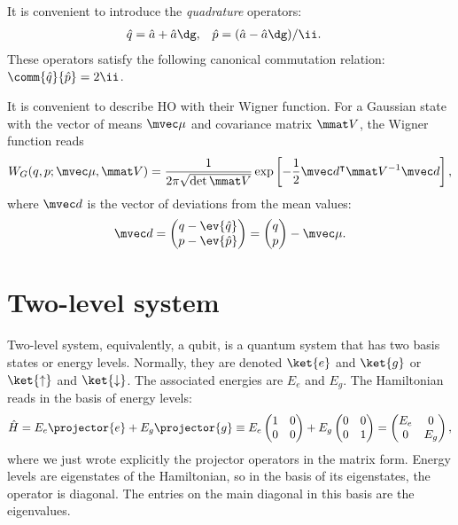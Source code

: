 \documentclass[fontsize=9pt,bookmarkpackage=false]{scrartcl}
\begin{document}
It is convenient to introduce the \emph{quadrature} operators:
\begin{align}
  \hat q & = \hat a + \hat a\dg, &
  \hat p & = ( \hat a - \hat a\dg ) / \ii.
\end{align}
These operators satisfy the following canonical commutation relation: $\comm{ \hat q }{ \hat p } = 2 \ii$.

It is convenient to describe HO with their Wigner function.
For a Gaussian state with the vector of means $\mvec \mu$ and covariance matrix $\mmat V$, the Wigner function reads
\begin{equation}
  W_G ( q , p ; \mvec \mu, \mmat V )
  =
  \frac{ 1 }{ 2 \pi \sqrt{ \det \mmat V }}
  \exp\left[
    - \frac 12 \mvec d^\intercal \mmat V^{-1}  \mvec d
  \right],
\end{equation}
where $\mvec d$ is the vector of deviations from the mean values:
\begin{equation}
  \mvec d
  =
  \begin{pmatrix}
    q - \ev{ \hat q } \\ p - \ev{ \hat p }
  \end{pmatrix}
  =
  \begin{pmatrix}
    q \\ p
  \end{pmatrix}- \mvec \mu.
\end{equation}

\section{Two-level system} %
\label{sec:two_level_system}

Two-level system, equivalently, a qubit, is a quantum system that has two basis states or energy levels.
Normally, they are denoted $\ket{e}$ and $\ket{g}$ or $\ket{\uparrow}$ and $\ket{\downarrow}$.
The associated energies are $E_e$ and $E_g$.
The Hamiltonian reads in the basis of energy levels:
\begin{equation}
  \hat H = E_e \projector{e} + E_g \projector{g}
  \equiv
  E_e
  \begin{pmatrix}
    1 & 0 \\ 0 & 0
  \end{pmatrix}
  +
  E_g
  \begin{pmatrix}
    0 & 0 \\ 0 & 1
  \end{pmatrix}
  =
  \begin{pmatrix}
    E_e & 0 \\ 0 & E_g
  \end{pmatrix}
  ,
\end{equation}
where we just wrote explicitly the projector operators in the matrix form.
Energy levels are eigenstates of the Hamiltonian, so in the basis of its eigenstates, the operator is diagonal.
The entries on the main diagonal in this basis are the eigenvalues.
\end{document}
